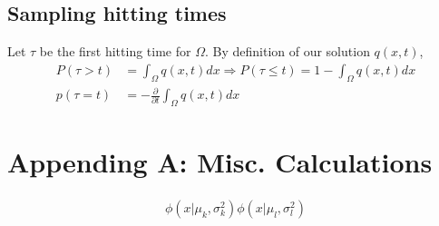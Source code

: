 \documentclass[10pt]{article}
\begin{document}
\subsection{Sampling hitting times}
Let $\tau$ be the first hitting time for $\Omega$. By definition of our solution $q(x,t)$,
\begin{align*}
  P(\tau > t) &= \int_\Omega q(x,t) dx \Rightarrow P(\tau \leq t) = 1 - \int_\Omega q(x,t) dx \\
  p(\tau = t) &= -\frac{\partial}{\partial t}\int_\Omega q(x,t) dx
\end{align*}

\section{Appending A: Misc. Calculations}

\begin{align*}
 \phi(x|\mu_k, \sigma_k^2)\phi(x|\mu_l, \sigma_l^2)
\end{align*}



% 

\end{document}
